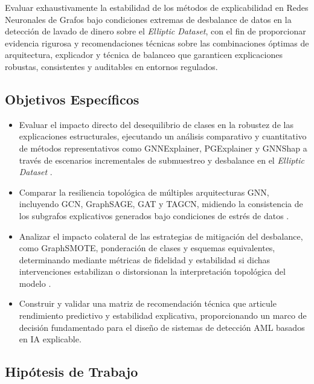 Evaluar exhaustivamente la estabilidad de los métodos de explicabilidad en Redes Neuronales de Grafos bajo condiciones extremas de desbalance de datos en la detección de lavado de dinero sobre el \textit{Elliptic Dataset}, con el fin de proporcionar evidencia rigurosa y recomendaciones técnicas sobre las combinaciones óptimas de arquitectura, explicador y técnica de balanceo que garanticen explicaciones robustas, consistentes y auditables en entornos regulados.

\bigskip

\subsection{Objetivos Específicos}

\begin{itemize}
    \item Evaluar el impacto directo del desequilibrio de clases en la robustez de las explicaciones estructurales, ejecutando un análisis comparativo y cuantitativo de métodos representativos como GNNExplainer, PGExplainer y GNNShap a través de escenarios incrementales de submuestreo y desbalance en el \textit{Elliptic Dataset} \cite{Ying2019Gnnexplainer:Networks, Luo2020ParameterizedNetwork, Akkas2024Gnnshap:Values}.
    \item Comparar la resiliencia topológica de múltiples arquitecturas GNN, incluyendo GCN, GraphSAGE, GAT y TAGCN, midiendo la consistencia de los subgrafos explicativos generados bajo condiciones de estrés de datos \cite{Weber2019Anti-MoneyForensics, Du2017TopologyNetworks}.
    \item Analizar el impacto colateral de las estrategias de mitigación del desbalance, como \mbox{GraphSMOTE}, ponderación de clases y esquemas equivalentes, determinando mediante métricas de fidelidad y estabilidad si dichas intervenciones estabilizan o distorsionan la interpretación topológica del modelo \cite{Zhao2021Graphsmote:Networks, Rai2025EvaluatingData, Fujiwara2024KnowledgeStability}.
    \item Construir y validar una matriz de recomendación técnica que articule rendimiento predictivo y estabilidad explicativa, proporcionando un marco de decisión fundamentado para el diseño de sistemas de detección AML basados en IA explicable.
\end{itemize}

\bigskip

\subsection{Hipótesis de Trabajo}

